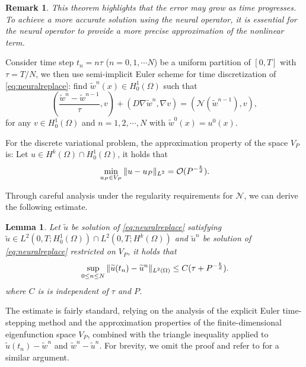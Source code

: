 \documentclass[preprint,12pt]{elsarticle}
\theoremstyle{plain}
\newtheorem{lemma}[theorem]{Lemma}
\newtheorem{remark}{Remark}[section]
\numberwithin{figure}{section}
\numberwithin{table}{section}
\begin{document}
\begin{remark}
	This theorem highlights that the error may grow as time progresses. To achieve a more accurate solution using the neural operator, it is essential for the neural operator to provide a more precise approximation of the nonlinear term.
\end{remark}


Consider time step $t_n=n\tau$ ($n = 0, 1,\cdots N$) be a uniform partition of $[0, T]$ with $\tau = T/N$, we then use semi-implicit Euler scheme for time discretization of \eqref{eq:neuralreplace}: find $\widetilde{w}^n(x)\in H^1_0(\Omega)$ such that
\begin{equation}\label{eq:semidiscret}
	(\frac{\widetilde{w}^{n}-\widetilde{w}^{n-1}}{\tau},v) +(D\nabla \widetilde{w}^{n},\nabla v) = (\mathcal{N}(\widetilde{w}^{n-1}),v),
\end{equation}
for any $v\in H_0^1(\Omega)$ and $n=1,2,\cdots,N$ with $\widetilde{w}^0(x) = u^0(x)$.


For the discrete variational problem, the approximation property of the space $V_P$ is: Let $u\in H^k(\Omega)\cap H_0^1(\Omega)$, it holds that
\begin{equation}
	\min_{u_P\in V_P}	\| u -u_P\|_{L^2} = \mathcal{O}(P^{-{k\over d}}).
\end{equation}

Through careful analysis under the regularity requirements for $\mathcal{N}$, we can derive the following  estimate.



\begin{lemma}\label{lem:err-dis}
	Let  $\widetilde{u}$ be solution of \eqref{eq:neuralreplace} satisfying $\widetilde{u}\in L^2(0,T;H_0^1(\Omega))\cap L^2(0,T;H^k(\Omega))$ and $\widetilde{u}^n$ be solution of \eqref{eq:neuralreplace} restricted on $V_P$, it holds that
	\begin{equation}\label{eq:errorestimate}
		\sup_{0\le n\le N}	\|\widetilde{u}(t_n)-\widetilde{u}^n\|_{L^2(\Omega)} \le C(\tau+P^{-{k\over d}}).
	\end{equation}
	where $C$ is is independent of $\tau $ and $P$. 
\end{lemma}

The estimate is fairly standard, relying on the analysis of the explicit Euler time-stepping method and the approximation properties of the finite-dimensional eigenfunction space $V_P$, combined with the triangle inequality applied to $\widetilde{u}(t_n)-\widetilde{w}^n$ and $\widetilde{w}^n-\widetilde{u}^n$. For brevity, we omit the proof and refer to \cite{thomee2007galerkin} for a similar argument.
\end{document}
